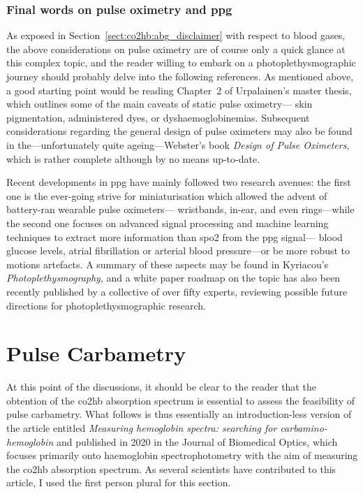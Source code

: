 \subsubsection{Final words on pulse oximetry and \texorpdfstring{\gls{ppg}}{PPG}}

As exposed in Section~\ref{sect:co2hb:abg_disclaimer} with respect to blood gases, the above considerations on pulse oximetry are of course only a quick glance at this complex topic, and the reader willing to embark on a photoplethysmographic journey should probably delve into the following references. As mentioned above, a good starting point would be reading Chapter~2 of Urpalainen's master thesis\cite{katja2011}, which outlines some of the main caveats of static pulse oximetry---\eg{} skin pigmentation\cite{shi2022, alhalawani2023}, administered dyes\cite{scheller1986}, or dyshaemoglobinemias\cite{wukitsch1987, ralston1991}. Subsequent considerations regarding the general design of pulse oximeters may also be found in the---unfortunately quite ageing---Webster's book \textit{Design of Pulse Oximeters}\cite{webster1997design}, which is rather complete although by no means up-to-date.

Recent developments in \gls{ppg} have mainly followed two research avenues:\mfrin{} the first one is the ever-going strive for miniaturisation which allowed the advent of battery-ran wearable pulse oximeters---\eg{} wristbands\cite{jiang2023}, in-ear\cite{azudin2023}, and even rings\cite{boukhayma2021}---while the second one focuses on advanced signal processing and machine learning techniques to extract more information than \gls{spo2} from the \gls{ppg} signal---\eg{} blood glucose levels\cite{tjahjadi2022}, atrial fibrillation\cite{manetasstavrakakis2023} or arterial blood pressure\cite{elhajj2020}---or be more robust to motions artefacts\cite{lee2022}. A summary of these aspects may be found in Kyriacou's \textit{Photoplethysmography}\cite{kyriacou2021photoplethysmography}, and a white paper roadmap on the topic has also been recently published by a collective of over fifty experts, reviewing possible future directions for photoplethysmographic research\cite{charlton2023}.

\section{Pulse Carbametry}\label{sect:co2hb:pulse_carbametry}

At this point of the discussions, it should be clear to the reader that the obtention of the \gls{co2hb} absorption spectrum is essential to assess the feasibility of pulse carbametry. What follows is thus essentially an introduction-less version of the article entitled \textit{Measuring hemoglobin spectra: searching for carbamino-hemoglobin} and published in 2020 in the Journal of Biomedical Optics\cite{dervieux2020}, which focuses primarily onto haemoglobin spectrophotometry with the aim of measuring the \gls{co2hb} absorption spectrum. As several scientists have contributed to this article, I used the first person plural for this section.

